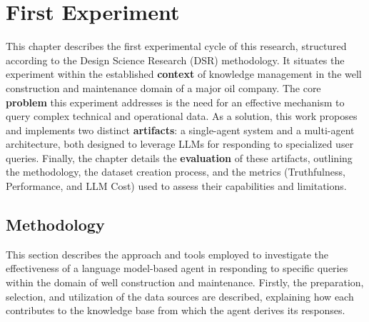 
\chapter{First Experiment}


    This chapter describes the first experimental cycle of this research, structured according to the Design Science Research (DSR) methodology. It situates the experiment within the established \textbf{context} of knowledge management in the well construction and maintenance domain of a major oil company. The core \textbf{problem} this experiment addresses is the need for an effective mechanism to query complex technical and operational data. As a solution, this work proposes and implements two distinct \textbf{artifacts}: a single-agent system and a multi-agent architecture, both designed to leverage LLMs for responding to specialized user queries. Finally, the chapter details the \textbf{evaluation} of these artifacts, outlining the methodology, the dataset creation process, and the metrics (Truthfulness, Performance, and LLM Cost) used to assess their capabilities and limitations.




    

    \section{Methodology}

        This section describes the approach and tools employed to investigate the effectiveness of a language model-based agent in responding to specific queries within the domain of well construction and maintenance.
        Firstly, the preparation, selection, and utilization of the data sources are described, explaining how each contributes to the knowledge base from which the agent derives its responses.

